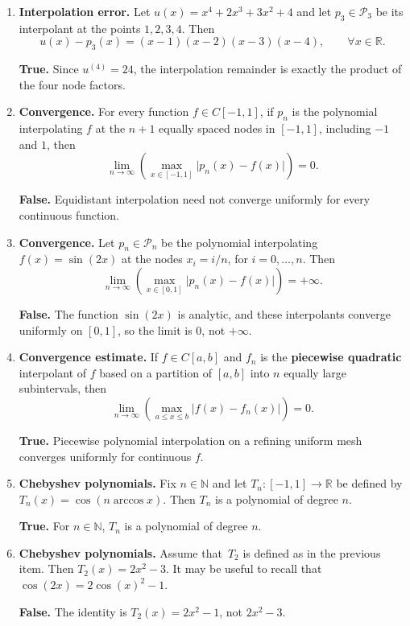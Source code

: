 \documentclass[a4paper]{article}
\newcommand{\answer}[1]{%
    \ifdefined\showsolutions
        \par\smallskip
        {\small\color{blue!60!black}#1\par}
    \fi
}
\begin{document}
\begin{enumerate}
    \item
        \textbf{Interpolation error.}
        Let $u(x)=x^4+2x^3+3x^2+4$ and let $p_3\in\mathcal P_3$ be its interpolant at
        the points $1,2,3,4$. Then
        \[
            u(x)-p_3(x)=(x-1)(x-2)(x-3)(x-4),\qquad \forall x\in\mathbb R.
        \]
        \answer{\textbf{True.}
        Since $u^{(4)}=24$, the interpolation remainder is exactly the product of the four node factors.}

    \item
        \textbf{Convergence.}
        For every function $f\in C[-1,1]$, if $p_n$ is the polynomial interpolating
        $f$ at the $n+1$ equally spaced nodes in $[-1,1]$, including $-1$ and $1$, then
        \[
            \lim_{n\to\infty} \left( \max_{x\in[-1,1]}\bigl\lvert p_n(x)-f(x)\bigr\rvert \right)=0.
        \]
        \answer{\textbf{False.}
        Equidistant interpolation need not converge uniformly for every continuous function.}

    \item
        \textbf{Convergence.}
        Let $p_n \in \mathcal P_n$ be the polynomial interpolating
        $f(x)=\sin(2x)$ at the nodes $x_i=i/n$, for $i=0,\dotsc,n$. Then
        \[
            \lim_{n\to\infty} \left( \max_{x\in[0,1]} \bigl\lvert p_n(x)-f(x)\bigr\rvert \right) = + \infty.
        \]
        \answer{\textbf{False.}
        The function $\sin(2x)$ is analytic, and these interpolants converge uniformly on $[0,1]$, so the limit is $0$, not $+\infty$.}

    \item
        \textbf{Convergence estimate.}
        If $f\in C[a,b]$ and $f_n$ is the \textbf{piecewise quadratic} interpolant of $f$ based on a partition of $[a,b]$ into $n$ 
        equally large subintervals, then
        \[
            \lim_{n\to\infty}\left( \max_{a\leq x\leq b}\bigl\lvert f(x)-f_n(x)\bigr\rvert \right)=0.
        \]
        \answer{\textbf{True.}
        Piecewise polynomial interpolation on a refining uniform mesh converges uniformly for continuous $f$.}

    \item
        \textbf{Chebyshev polynomials.}
        Fix $n \in \mathbb N$ and let $T_n \colon[-1,1]\to\mathbb R$ be defined by $T_n(x) = \cos(n \arccos x)$.
        Then $T_n$ is a polynomial of degree $n$.
        \answer{\textbf{True.}
        For $n\in\mathbb N$, $T_n$ is a polynomial of degree $n$.}

    \item
        \textbf{Chebyshev polynomials.}
        Assume that~$T_2$ is defined as in the previous item.
        Then $T_2(x) = 2x^2 - 3$.
        It may be useful to recall that~$\cos(2x) = 2\cos(x)^2 - 1$.
        \answer{\textbf{False.}
        The identity is $T_2(x)=2x^2-1$, not $2x^2-3$.}


\end{enumerate}
\end{document}
